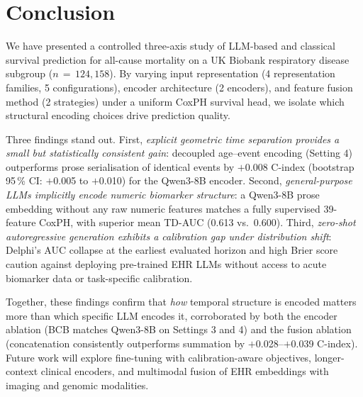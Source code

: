 \section{Conclusion}

We have presented a controlled three-axis study of LLM-based and classical
survival prediction for all-cause mortality on a UK Biobank respiratory
disease subgroup ($n\,=\,124{,}158$).
By varying input representation (4 representation families, 5 configurations),
encoder architecture (2 encoders), and feature fusion method (2 strategies)
under a uniform CoxPH survival head, we isolate which structural encoding
choices drive prediction quality.

Three findings stand out.
First, \emph{explicit geometric time separation provides a small but
statistically consistent gain}: decoupled age--event encoding (Setting 4)
outperforms prose serialisation of identical events by $+$0.008 C-index
(bootstrap 95\,\% CI: $+$0.005 to $+$0.010) for the Qwen3-8B encoder.
Second, \emph{general-purpose LLMs implicitly encode numeric biomarker
structure}: a Qwen3-8B prose embedding without any raw numeric features
matches a fully supervised 39-feature CoxPH, with superior mean TD-AUC
(0.613 vs.\ 0.600).
Third, \emph{zero-shot autoregressive generation exhibits a calibration
gap under distribution shift}: Delphi's AUC collapse at the earliest
evaluated horizon and high Brier score caution against deploying
pre-trained EHR LLMs without access to acute biomarker data or
task-specific calibration.

Together, these findings confirm that \emph{how} temporal structure is
encoded matters more than which specific LLM encodes it, corroborated by
both the encoder ablation (BCB matches Qwen3-8B on Settings 3 and 4) and
the fusion ablation (concatenation consistently outperforms
summation by $+$0.028--$+$0.039 C-index).
Future work will explore fine-tuning with calibration-aware objectives,
longer-context clinical encoders, and multimodal fusion of EHR embeddings
with imaging and genomic modalities.
